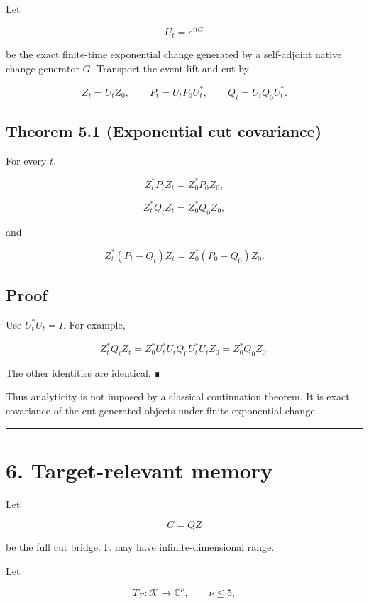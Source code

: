 Let

\[
U_t=e^{itG}
\]

be the exact finite-time exponential change generated by a self-adjoint native
change generator \(G\). Transport the event lift and cut by

\[
Z_t=U_tZ_0,
\qquad
P_t=U_tP_0U_t^*,
\qquad
Q_t=U_tQ_0U_t^*.
\]

\hypertarget{theorem-5.1-exponential-cut-covariance}{%
\subsection{Theorem 5.1 (Exponential cut covariance)}\label{theorem-5.1-exponential-cut-covariance}}

For every \(t\),

\[
Z_t^*P_tZ_t=Z_0^*P_0Z_0,
\]

\[
Z_t^*Q_tZ_t=Z_0^*Q_0Z_0,
\]

and

\[
Z_t^*(P_t-Q_t)Z_t=Z_0^*(P_0-Q_0)Z_0.
\]

\hypertarget{proof-2}{%
\subsection{Proof}\label{proof-2}}

Use \(U_t^*U_t=I\). For example,

\[
Z_t^*Q_tZ_t
=Z_0^*U_t^*U_tQ_0U_t^*U_tZ_0
=Z_0^*Q_0Z_0.
\]

The other identities are identical. ∎

Thus analyticity is not imposed by a classical continuation theorem. It is
exact covariance of the cut-generated objects under finite exponential change.

\begin{center}\rule{0.5\linewidth}{0.5pt}\end{center}

\hypertarget{target-relevant-memory}{%
\section{6. Target-relevant memory}\label{target-relevant-memory}}

Let

\[
C=QZ
\]

be the full cut bridge. It may have infinite-dimensional range.

Let

\[
T_\Sigma:\mathcal K\longrightarrow\mathbb C^\nu,
\qquad
\nu\le5,
\]


